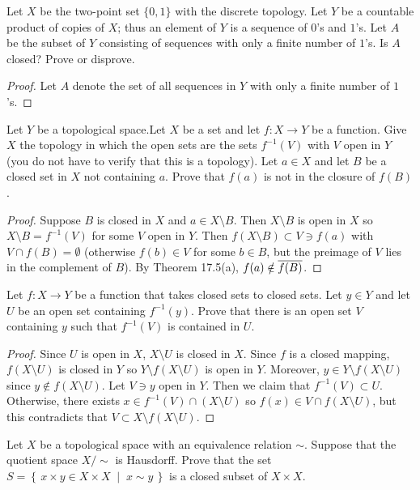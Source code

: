 \begin{problem}
Let $X$ be the two-point set $\{0,1\}$ with the discrete
topology. Let $Y$ be a countable product of copies of $X$; thus
an element of $Y$ is a sequence of $0$'s and $1$'s. Let $A$ be
the subset of $Y$ consisting of sequences with only a finite
number of $1$'s. Is $A$ closed? Prove or disprove.
\end{problem}
\begin{proof}
Let $A$ denote the set of all sequences in $Y$ with only a finite
number of $1$'s.
\end{proof}
\begin{problem}
Let $Y$ be a topological space.Let $X$ be a set and let $f\colon
X\to Y$ be a function. Give $X$ the topology in which the open
sets are the sets $f^{-1}(V)$ with $V$ open in $Y$ (you do not
have to verify that this is a topology). Let $a\in X$ and let $B$
be a closed set in $X$ not containing $a$. Prove that $f(a)$ is
not in the closure of $f(B)$.
\end{problem}
\begin{proof}
Suppose $B$ is closed in $X$ and $a\in X\setminus B$. Then
$X\setminus B$ is open in $X$ so $X\setminus B=f^{-1}(V)$ for
some $V$ open in $Y$. Then $f(X\setminus B)\subset V\ni f(a)$
with $V\cap f(B)=\emptyset$ (otherwise $f(b)\in V$ for some $b\in
B$, but the preimage of $V$ lies in the complement of $B$). By
Theorem 17.5(a), $f(a)\notin\overline{f(B)}$.
\end{proof}
\begin{problem}
Let $f\colon X\to Y$ be a function that takes closed sets to
closed sets. Let $y\in Y$ and let $U$ be an open set containing
$f^{-1}(y)$. Prove that there is an open set $V$ containing $y$
such that $f^{-1}(V)$ is contained in $U$.
\end{problem}
\begin{proof}
Since $U$ is open in $X$, $X\setminus U$ is closed in $X$. Since
$f$ is a closed mapping, $f(X\setminus U)$ is closed in $Y$ so
$Y\setminus f(X\setminus U)$ is open in $Y$. Moreover, $y\in
Y\setminus f(X\setminus U)$ since $y\notin f(X\setminus U)$. Let
$V\ni y$ open in $Y$. Then we claim that $f^{-1}(V)\subset
U$. Otherwise, there exists $x\in f^{-1}(V)\cap(X\setminus U)$ so
$f(x)\in V\cap f(X\setminus U)$, but this contradicts that
$V\subset X\setminus f(X\setminus U)$.
\end{proof}
\begin{problem}
Let $X$ be a topological space with an equivalence relation
$\sim$. Suppose that the quotient space $X/{\sim}$ is
Hausdorff. Prove that the set $S=\left\{\,x\times y\in X\times
  X\;\middle|\;x\sim y\,\right\}$ is a closed subset of $X\times
X$.
\end{problem}
